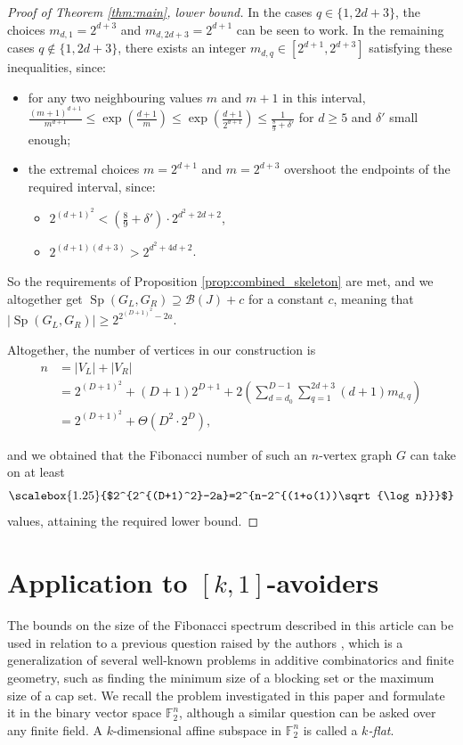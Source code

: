 \documentclass[10pt,a4paper]{article}
\numberwithin{equation}{section}
\newcommand{\ff}{\mathbb{F}}
\newcommand{\cB}{\mathcal{B}}
\DeclareMathOperator{\Sp}{Sp}
\begin{document}
\begin{proof}[Proof of Theorem \ref{thm:main}, lower bound]
In the cases $q\in \{1, 2d+3\}$, the choices $m_{d,1}=2^{d+3}$ and $m_{d,2d+3}=2^{d+1}$ can be seen to work. In the remaining cases $q\not\in\{1, 2d+3\}$, there exists an integer $m_{d,q}\in [2^{d+1}, 2^{d+3}]$ satisfying these inequalities, since:
\begin{itemize}
\itemsep0em
\item for any two neighbouring values $m$ and $m+1$ in this interval, $\frac{(m+1)^{d+1}}{m^{d+1}}\le \exp\left(\frac{d+1}{m}\right)\le \exp\left(\frac{d+1}{2^{d+1}}\right)\le \frac{1}{\frac89+\delta'}$ for $d\ge 5$ and $\delta'$ small enough;
\item the extremal choices $m=2^{d+1}$ and $m=2^{d+3}$ overshoot the endpoints of the required interval, since:
\begin{itemize}[label=$\circ$]
\itemsep0em
\item $2^{(d+1)^2}<\left(\frac89+\delta'\right)\cdot 2^{d^2+2d+2}$,
\item $2^{(d+1)(d+3)}>2^{d^2+4d+2}$.
\end{itemize}
\end{itemize}

So the requirements of Proposition \ref{prop:combined_skeleton} are met, and we altogether get $\Sp(G_L,G_R)\supseteq \cB(J)+c$ for a constant $c$, meaning that $|\Sp(G_L,G_R)|\ge 2^{2^{(D+1)^2}-2a}$.

Altogether, the number of vertices in our construction is
\begin{equation*}
\begin{split}
n &= |V_L| + |V_R| \\
&= 2^{(D+1)^2} + (D+1)2^{D+1} + 2\left(\sum_{d=d_0}^{D-1} \sum_{q=1}^{2d+3} (d+1)m_{d,q}\right) \\
&= 2^{(D+1)^2} + \Theta(D^2\cdot 2^D),
\end{split}
\end{equation*}

and we obtained that the Fibonacci number of such an $n$-vertex graph $G$ can take on at least $$\scalebox{1.25}{$2^{2^{(D+1)^2}-2a}=2^{n-2^{(1+o(1))\sqrt{\log n}}}$}$$ values, attaining the required lower bound.
\end{proof}

\section{Application to $[k,1]$-avoiders}\label{sec:avoiders}

The bounds on the size of the Fibonacci spectrum described in this article can be used in relation to a previous question raised by the authors \cite{KN25}, which is a generalization of several well-known problems in additive combinatorics and finite geometry, such as finding the minimum size of a blocking set or the maximum size of a cap set.
We recall the problem investigated in this paper \cite{KN25} and formulate it in the binary vector space $\ff_2^n$, although a similar question can be asked over any finite field. A $k$-dimensional affine subspace in $\ff_2^n$ is called a \textit{$k$-flat}.
\end{document}
